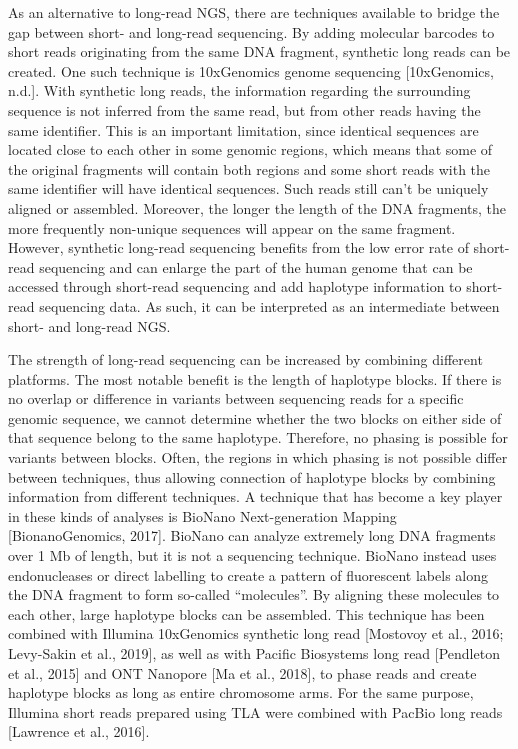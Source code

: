 {As an alternative to long-read NGS, there are techniques available to bridge the gap between short- and long-read sequencing. 
By adding molecular barcodes to short reads originating from the same DNA fragment, synthetic long reads can be created. 
One such technique is 10xGenomics genome sequencing [10xGenomics, n.d.]. 
With synthetic long reads, the information regarding the surrounding sequence is not inferred from the same read, but from other reads having the same identifier. 
This is an important limitation, since identical sequences are located close to each other in some genomic regions, which means that some of the original fragments will contain both regions and some short reads with the same identifier will have identical sequences. 
Such reads still can’t be uniquely aligned or assembled. 
Moreover, the longer the length of the DNA fragments, the more frequently non-unique sequences will appear on the same fragment. However, synthetic long-read sequencing benefits from the low error rate of short-read sequencing and can enlarge the part of the human genome that can be accessed through short-read sequencing and add haplotype information to short-read sequencing data. 
As such, it can be interpreted as an intermediate between short- and long-read NGS.

The strength of long-read sequencing can be increased by combining different platforms. 
The most notable benefit is the length of haplotype blocks. 
If there is no overlap or difference in variants between sequencing reads for a specific genomic sequence, we cannot determine whether the two blocks on either side of that sequence belong to the same haplotype. Therefore, no phasing is possible for variants between blocks. Often, the regions in which phasing is not possible differ between techniques, thus allowing connection of haplotype blocks by combining information from
different techniques. 
A technique that has become a key player in these kinds of analyses is BioNano Next-generation Mapping [BionanoGenomics, 2017]. 
BioNano can analyze extremely long DNA fragments over 1 Mb of length, but it is not a sequencing technique. 
BioNano instead uses endonucleases or direct labelling to create a pattern of fluorescent labels along the DNA fragment to form so-called “molecules”. By aligning these molecules to each other, large haplotype blocks can be assembled. 
This technique has been combined with Illumina 10xGenomics synthetic long read [Mostovoy et al., 2016; Levy-Sakin et al., 2019], as well as with Pacific Biosystems long read [Pendleton et al., 2015] and ONT Nanopore [Ma et al., 2018], to phase reads and create haplotype blocks as long as entire chromosome arms. 
For the same purpose, Illumina short reads prepared using TLA were combined with PacBio long reads [Lawrence et al., 2016].

}
